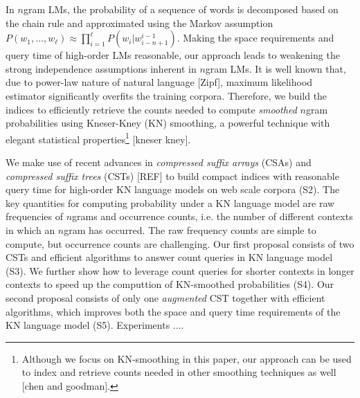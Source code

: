 In $n$gram LMs, the probability of a sequence of words is decomposed based on the chain rule 
and approximated using the Markov assumption 
$P(w_1,\ldots,w_{\ell}) \approx \prod_{i=1}^{\ell} P(w_i|w_{i-n+1}^{i-1})$. 
%
%
Making the space requirements  and query time of high-order LMs reasonable,
our approach leads to weakening the strong independence assumptions inherent in $n$gram LMs.
%
It is well known that, due to power-law nature of natural language [Zipf], maximum likelihood 
estimator significantly overfits the training corpora. 
%
Therefore, we build the indices to efficiently retrieve the counts 
needed to compute \emph{smoothed} $n$gram probabilities using Kneser-Kney (KN) smoothing, 
a powerful technique with elegant statistical properties\footnote{Although 
we focus on KN-smoothing in this paper, our approach can be used to index and retrieve 
counts needed in other smoothing techniques as well [chen and goodman].} [kneser kney].  
 
We make use of recent advances in \emph{compressed suffix arrays} (CSAs)  and
\emph{compressed suffix trees} (CSTs) [REF]  to build compact indices  
with reasonable query time for high-order KN language models on web scale corpora (S2).
%
The key quantities for computing probability under a KN 
language model are raw frequencies of $n$grams 
and occurrence counts, i.e. the number of different contexts in which an $n$gram has occurred.
%
The raw frequency counts are simple to compute, but occurrence counts 
are challenging. 
%
Our first proposal consists of two CSTs and efficient algorithms to answer count queries 
in KN language model (S3). 
% 
We further show how to leverage count queries for shorter contexts in longer contexts 
to speed up the computtion of KN-smoothed probabilities (S4).
%
Our second proposal consists of only one \emph{augmented} CST together with efficient 
algorithms, which improves both the space and query time requirements of the 
KN language model (S5). 
% 
Experiments ....


%

